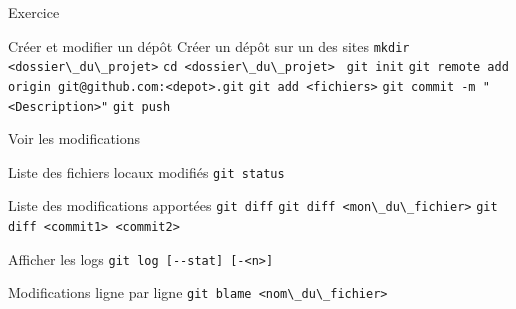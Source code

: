 \documentclass{beamer}
\begin{document}
\begin{frame}[fragile]{Exercice}
  \begin{exampleblock}{Créer et modifier un dépôt}
    Créer un dépôt sur un des sites\linebreak
    \textcolor{commandcolor}{\verb?mkdir <dossier\_du\_projet>?}\linebreak
    \textcolor{commandcolor}{\verb?cd <dossier\_du\_projet> ?}\linebreak
    \textcolor{commandcolor}{\verb?git init?}\linebreak
    \textcolor{commandcolor}{\verb?git remote add origin git@github.com:<depot>.git?}\linebreak
    \linebreak
    \textcolor{commandcolor}{\verb?git add <fichiers>?}\linebreak
    \textcolor{commandcolor}{\verb?git commit -m "<Description>"?}\linebreak
    \textcolor{commandcolor}{\verb?git push?}
  \end{exampleblock}
\end{frame}


\begin{frame}[fragile]{Voir les modifications}
  \begin{block}{Liste des fichiers locaux modifiés}
    \textcolor{commandcolor}{\verb?git status?}
  \end{block}
  \begin{block}{Liste des modifications apportées}
    \textcolor{commandcolor}{\verb?git diff?}\linebreak
    \textcolor{commandcolor}{\verb?git diff <mon\_du\_fichier>?}\linebreak
    \textcolor{commandcolor}{\verb?git diff <commit1> <commit2>?}
  \end{block}
  \begin{block}{Afficher les logs}
    \textcolor{commandcolor}{\verb?git log [--stat] [-<n>]?}
  \end{block}
  \begin{block}{Modifications ligne par ligne}
    \textcolor{commandcolor}{\verb?git blame <nom\_du\_fichier>?}
  \end{block}
\end{frame}
\end{document}
